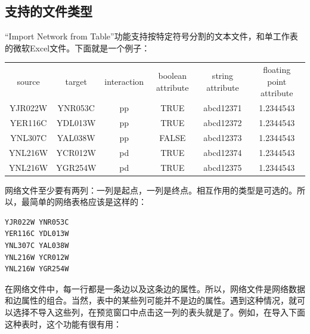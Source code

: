 \subsection{支持的文件类型}
``Import Network from Table''功能支持按特定符号分割的文本文件，和单工作表的微软Excel文件。下面就是一个例子：

\medskip

{\tiny
\begin{tabular}{cccccc}
source  &target&  interaction&  boolean attribute&  string attribute&        floating point attribute\\
YJR022W &YNR053C &pp     & TRUE  &  abcd12371    &   1.2344543\\
YER116C &YDL013W &pp     & TRUE   & abcd12372    &   1.2344543\\
YNL307C &YAL038W &pp     & FALSE  & abcd12373    &   1.2344543\\
YNL216W &YCR012W &pd     & TRUE   & abcd12374    &   1.2344543\\
YNL216W &YGR254W &pd     & TRUE   & abcd12375    &   1.2344543
\end{tabular}}


网络文件至少要有两列：一列是起点，一列是终点。相互作用的类型是可选的。所以，最简单的网络表格应该是这样的：

\begin{verbatim}
YJR022W YNR053C
YER116C YDL013W
YNL307C YAL038W
YNL216W YCR012W
YNL216W YGR254W
\end{verbatim}

在网络文件中，每一行都是一条边以及这条边的属性。所以，网络文件是网络数据和边属性的组合。当然，表中的某些列可能并不是边的属性。遇到这种情况，就可以选择不导入这些列，在预览窗口中点击这一列的表头就是了。例如，在导入下面这种表时，这个功能有很有用：

